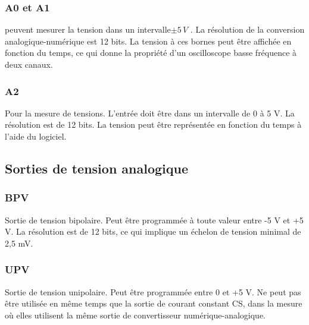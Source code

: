 \documentclass{book}
\begin{document}
\subsubsection{A0 et A1}





peuvent mesurer la tension dans un intervalle$\pm5\, V$ . La résolution de la conversion analogique-numérique est 12 bits. La tension à ces bornes peut être affichée en fonction du temps, ce qui donne la propriété d'un oscilloscope basse fréquence à deux canaux.




\subsubsection{A2}





Pour la mesure de tensions. L'entrée doit être dans un intervalle de 0 à 5 V. La résolution est de 12 bits. La tension peut être représentée en fonction du temps à l'aide du logiciel.




\subsection{Sorties de tension analogique}






\subsubsection{BPV}





Sortie de tension bipolaire. Peut être programmée à toute valeur entre -5 V et +5 V. La résolution est de 12 bits, ce qui implique un échelon de tension minimal de 2,5 mV.




\subsubsection{UPV}





Sortie de tension unipolaire. Peut être programmée entre 0 et +5 V. Ne peut pas être utilisée en même temps que la sortie de courant constant CS, dans la mesure où elles utilisent la même sortie de convertisseur numérique-analogique.
\end{document}
